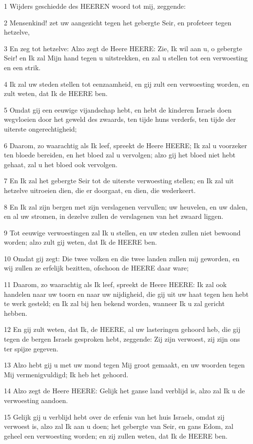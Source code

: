 \par 1 Wijders geschiedde des HEEREN woord tot mij, zeggende:
\par 2 Mensenkind! zet uw aangezicht tegen het gebergte Seir, en profeteer tegen hetzelve,
\par 3 En zeg tot hetzelve: Alzo zegt de Heere HEERE: Zie, Ik wil aan u, o gebergte Seir! en Ik zal Mijn hand tegen u uitstrekken, en zal u stellen tot een verwoesting en een strik.
\par 4 Ik zal uw steden stellen tot eenzaamheid, en gij zult een verwoesting worden, en zult weten, dat Ik de HEERE ben.
\par 5 Omdat gij een eeuwige vijandschap hebt, en hebt de kinderen Israels doen wegvloeien door het geweld des zwaards, ten tijde huns verderfs, ten tijde der uiterste ongerechtigheid;
\par 6 Daarom, zo waarachtig als Ik leef, spreekt de Heere HEERE; Ik zal u voorzeker ten bloede bereiden, en het bloed zal u vervolgen; alzo gij het bloed niet hebt gehaat, zal u het bloed ook vervolgen.
\par 7 En Ik zal het gebergte Seir tot de uiterste verwoesting stellen; en Ik zal uit hetzelve uitroeien dien, die er doorgaat, en dien, die wederkeert.
\par 8 En Ik zal zijn bergen met zijn verslagenen vervullen; uw heuvelen, en uw dalen, en al uw stromen, in dezelve zullen de verslagenen van het zwaard liggen.
\par 9 Tot eeuwige verwoestingen zal Ik u stellen, en uw steden zullen niet bewoond worden; alzo zult gij weten, dat Ik de HEERE ben.
\par 10 Omdat gij zegt: Die twee volken en die twee landen zullen mij geworden, en wij zullen ze erfelijk bezitten, ofschoon de HEERE daar ware;
\par 11 Daarom, zo waarachtig als Ik leef, spreekt de Heere HEERE: Ik zal ook handelen naar uw toorn en naar uw nijdigheid, die gij uit uw haat tegen hen hebt te werk gesteld; en Ik zal bij hen bekend worden, wanneer Ik u zal gericht hebben.
\par 12 En gij zult weten, dat Ik, de HEERE, al uw lasteringen gehoord heb, die gij tegen de bergen Israels gesproken hebt, zeggende: Zij zijn verwoest, zij zijn ons ter spijze gegeven.
\par 13 Alzo hebt gij u met uw mond tegen Mij groot gemaakt, en uw woorden tegen Mij vermenigvuldigd; Ik heb het gehoord.
\par 14 Alzo zegt de Heere HEERE: Gelijk het ganse land verblijd is, alzo zal Ik u de verwoesting aandoen.
\par 15 Gelijk gij u verblijd hebt over de erfenis van het huis Israels, omdat zij verwoest is, alzo zal Ik aan u doen; het gebergte van Seir, en gans Edom, zal geheel een verwoesting worden; en zij zullen weten, dat Ik de HEERE ben.

